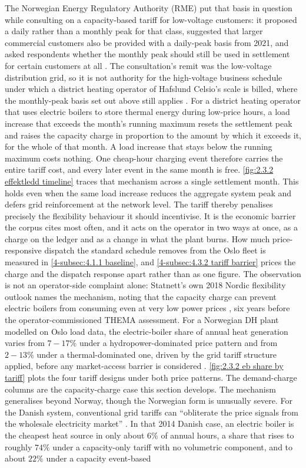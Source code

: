 The Norwegian Energy Regulatory Authority (RME) put that basis in question while consulting on a capacity-based tariff for low-voltage customers: it proposed a daily rather than a monthly peak for that class, suggested that larger commercial customers also be provided with a daily-peak basis from 2021, and asked respondents whether the monthly peak should still be used in settlement for certain customers at all \cite{eriksen_proposed_2022}. The consultation's remit was the low-voltage distribution grid, so it is not authority for the high-voltage business schedule under which a district heating operator of Hafslund Celsio's scale is billed, where the monthly-peak basis set out above still applies \cite{elvia_dagens_2022, ove_flataker_national_2020}. For a district heating operator that uses electric boilers to store thermal energy during low-price hours, a load increase that exceeds the month's running maximum resets the settlement peak and raises the capacity charge in proportion to the amount by which it exceeds it, for the whole of that month. A load increase that stays below the running maximum costs nothing. One cheap-hour charging event therefore carries the entire tariff cost, and every later event in the same month is free. \autoref{fig:2.3.2 effektledd timeline} traces that mechanism across a single settlement month. This holds even when the same load increase reduces the aggregate system peak and defers grid reinforcement at the network level. The tariff thereby penalises precisely the flexibility behaviour it should incentivise. It is the economic barrier the corpus cites most often, and it acts on the operator in two ways at once, as a charge on the ledger and as a change in what the plant burns. How much price-responsive dispatch the standard schedule removes from the Oslo fleet is measured in \autoref{4-subsec:4.1.1 baseline}, and \autoref{4-subsec:4.3.2 tariff barrier} prices the charge and the dispatch response apart rather than as one figure. The observation is not an operator-side complaint alone: Statnett's own 2018 Nordic flexibility outlook names the mechanism, noting that the capacity charge can prevent electric boilers from consuming even at very low power prices \cite{holmefjord_fleksibilitet_2018}, six years before the operator-commissioned THEMA assessment. For a Norwegian DH plant modelled on Oslo load data, the electric-boiler share of annual heat generation varies from $7 - 17\%$ under a hydropower-dominated price pattern and from $2 - 13\%$ under a thermal-dominated one, driven by the grid tariff structure applied, before any market-access barrier is considered \cite{kirkerud_impacts_2016}. \autoref{fig:2.3.2 eb share by tariff} plots the four tariff designs under both price patterns. The demand-charge columns are the capacity-charge case this section develops. The mechanism generalises beyond Norway, though the Norwegian form is unusually severe. For the Danish system, conventional grid tariffs can ``obliterate the price signals from the wholesale electricity market'' \cite{skytte_design_2017}. In that 2014 Danish case, an electric boiler is the cheapest heat source in only about $6\%$ of annual hours, a share that rises to roughly $74\%$ under a capacity-only tariff with no volumetric component, and to about $22\%$ under a capacity event-based 